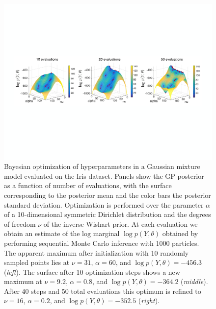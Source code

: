 \begin{figure}[t]
	\includegraphics[width=\textwidth]{mvn-mixture/axis_corr_mvn_gps}
	\caption{
		\label{fig:mvn-gp-surface}
		Bayesian optimization of hyperparameters in a Gaussian mixture model evaluated on the Iris dataset. Panels show the GP posterior as a function of number of evaluations, with the surface corresponding to the posterior mean and the color bars the posterior standard deviation. Optimization is performed over the parameter $\alpha$ of a 10-dimensional symmetric Dirichlet distribution and the degrees of freedom $\nu$ of the inverse-Wishart prior. At each evaluation we obtain an estimate of the log marginal $\log p(Y,\theta)$ obtained by performing sequential Monte Carlo inference with 1000 particles.  The apparent maximum after initialization with 10 randomly sampled points lies at $\nu=31$, $\alpha=60$, and $\log p(Y,\theta) = -456.3$ (\emph{left}).  The surface after 10 optimization steps shows a new maximum at $\nu=9.2$, $\alpha=0.8$, and $\log p(Y,\theta) = -364.2$ (\emph{middle}). After 40 steps and 50 total evaluations this optimum is refined to $\nu=16$, $\alpha = 0.2$, and $\log p(Y,\theta) = -352.5$  (\emph{right}).}
\end{figure}

